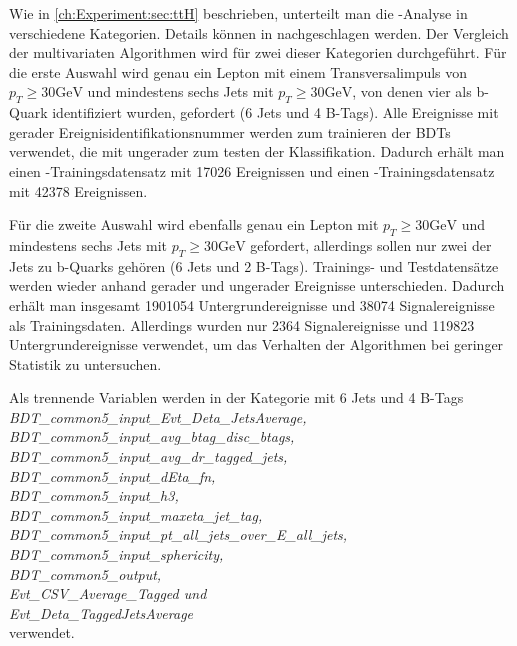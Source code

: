 Wie in \ref{ch:Experiment:sec:ttH} beschrieben, unterteilt man die \ttH-Analyse in verschiedene Kategorien. Details k\"onnen in \cite{CMS-PAS-HIG-16-004} nachgeschlagen werden. Der Vergleich der multivariaten Algorithmen wird f\"ur zwei dieser Kategorien durchgef\"uhrt. F\"ur die erste Auswahl wird genau ein Lepton mit einem Transversalimpuls von $p_T\geq \num{30}\si{\giga\electronvolt}$ und mindestens sechs Jets mit $p_T\geq \num{30}\si{\giga\electronvolt}$, von denen vier als b-Quark identifiziert wurden, gefordert (6 Jets und 4 B-Tags). Alle Ereignisse mit gerader Ereignisidentifikationsnummer werden zum trainieren der BDTs verwendet, die mit ungerader zum testen der Klassifikation. Dadurch erh\"alt man einen \ttH-Trainingsdatensatz mit 17026 Ereignissen und einen \ttb-Trainingsdatensatz mit 42378 Ereignissen.

F\"ur die zweite Auswahl wird ebenfalls genau ein Lepton mit $p_T\geq \num{30}\si{\giga\electronvolt}$ und mindestens sechs Jets mit $p_T\geq \num{30}\si{\giga\electronvolt}$ gefordert, allerdings sollen nur zwei der Jets zu b-Quarks geh\"oren (6 Jets und 2 B-Tags). Trainings- und Testdatens\"atze werden wieder anhand gerader und ungerader Ereignisse unterschieden. Dadurch erh\"alt man insgesamt 1901054 Untergrundereignisse und 38074 Signalereignisse als Trainingsdaten. Allerdings wurden nur 2364 Signalereignisse und 119823 Untergrundereignisse verwendet, um das Verhalten der Algorithmen bei geringer Statistik zu untersuchen. 

Als trennende Variablen werden in der Kategorie mit 6 Jets und 4 B-Tags\\{\it BDT\_common5\_input\_Evt\_Deta\_JetsAverage,\\BDT\_common5\_input\_avg\_btag\_disc\_btags,\\BDT\_common5\_input\_avg\_dr\_tagged\_jets, \\BDT\_common5\_input\_dEta\_fn, \\BDT\_common5\_input\_h3, \\BDT\_common5\_input\_maxeta\_jet\_tag, \\BDT\_common5\_input\_pt\_all\_jets\_over\_E\_all\_jets, \\BDT\_common5\_input\_sphericity, \\BDT\_common5\_output, \\Evt\_CSV\_Average\_Tagged und \\Evt\_Deta\_TaggedJetsAverage}\\verwendet.

